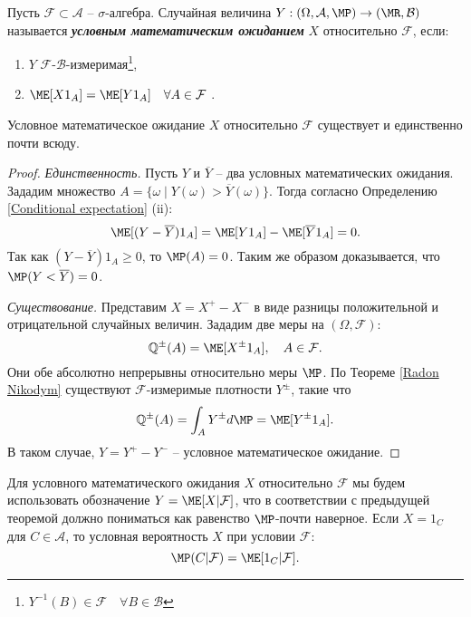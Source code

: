 \begin{defn}\label{Conditional expectation}
	Пусть $\mathcal{F} \subset \mathcal{A}$ -- $\sigma$-алгебра. Случайная величина $Y: (\Omega, \mathcal{A}, \MP) \rightarrow (\MR, \mathcal{B})$ называется \textbf{\textit{условным математическим ожиданием}} $X$ относительно $\mathcal{F}$, если:
	\begin{enumerate}
		\item $Y$ $\mathcal{F}$-$\mathcal{B}$-измеримая\footnote{$Y^{-1}(B) \in \mathcal{F} \quad \forall B \in \mathcal{B}$},
		\item $\ME[X 1_{A}]=\ME[Y 1_{A}] \quad \forall A \in \mathcal{F}$ .
	\end{enumerate}
\end{defn}

\begin{thm}\label{Existence and uniqueness of expectation}
	Условное математическое ожидание $X$ относительно $\mathcal{F}$ существует и единственно почти всюду.
\end{thm}

\begin{proof}
	\textit{Единственность.} Пусть $Y$ и $\overline{Y}$ -- два условных математических ожидания. Зададим множество $A=\{\omega \mid Y(\omega) > \overline{Y}({\omega}) \}$. Тогда согласно Определению \ref{Conditional expectation} (ii):
	\[\ME[(Y-\overline{Y})1_A]=\ME[Y1_A]-\ME[\overline{Y}1_A]=0.   \]
	Так как $(Y-\overline{Y})1_A \geq 0$, то $\MP(A)=0$. Таким же образом доказывается, что $\MP(Y<\overline{Y})=0$.
	
	\textit{Существование.} Представим $X=X^+-X^-$ в виде разницы положительной и отрицательной случайных величин. Зададим две меры на $(\Omega, \mathcal{F})$:
	\[\mathbb{Q}^{\pm}(A)=\ME[X^\pm 1_A],  \quad A \in \mathcal{F}.\]
	Они обе абсолютно непрерывны относительно меры $\MP$. По Теореме \ref{Radon Nikodym} существуют $\mathcal{F}$-измеримые плотности $Y^\pm$, такие что
	\[\mathbb{Q}^{\pm}(A)=\int_A Y^\pm d\MP = \ME[Y^\pm 1_A].\]
	В таком случае, $Y = Y^+-Y^-$ -- условное математическое ожидание.	
\end{proof}

\begin{rmrk}
	Для условного математического ожидания $X$ относительно $\mathcal{F}$ мы будем использовать обозначение $Y=\ME[X | \mathcal{F}]$, что в соответствии с предыдущей теоремой должно пониматься как равенство $\MP$-почти наверное. Если $X=1_C$ для $C \in \mathcal{A}$, то условная вероятность $X$ при условии $\mathcal{F}$:
	\[\MP(C|\mathcal{F})=\ME[1_C|\mathcal{F}].\]
\end{rmrk}

